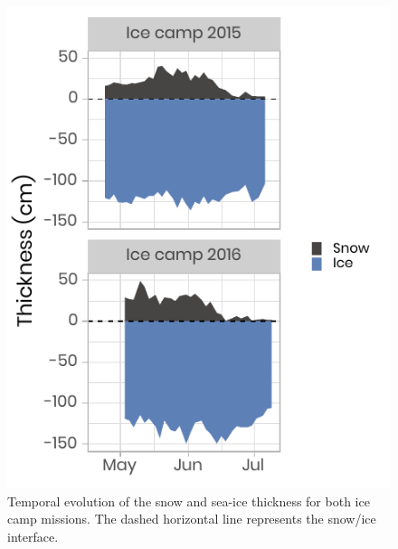 \documentclass[12pt,a4paper]{scrartcl}
\begin{document}
\begin{figure}[h]
	\centering
	\includegraphics[scale = 2]{../../../graphs/fig02.pdf}
	\caption{Temporal evolution of the snow and sea-ice thickness for both ice camp missions. The dashed horizontal line represents the snow/ice interface.}
\end{figure}

\clearpage
\newpage
\end{document}
